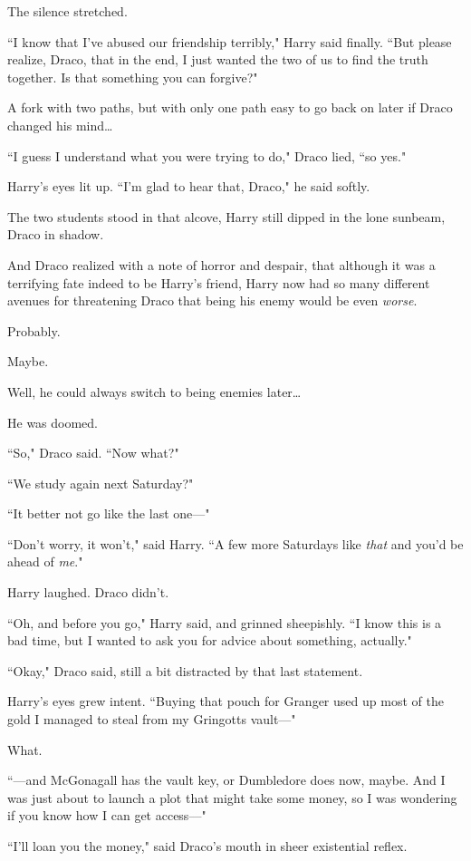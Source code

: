 The silence stretched.

``I know that I've abused our friendship terribly," Harry said finally. ``But please realize, Draco, that in the end, I just wanted the two of us to find the truth together. Is that something you can forgive?"

A fork with two paths, but with only one path easy to go back on later if Draco changed his mind{\ldots}

``I guess I understand what you were trying to do," Draco lied, ``so yes."

Harry's eyes lit up. ``I'm glad to hear that, Draco," he said softly.

The two students stood in that alcove, Harry still dipped in the lone sunbeam, Draco in shadow.

And Draco realized with a note of horror and despair, that although it was a terrifying fate indeed to be Harry's friend, Harry now had so many different avenues for threatening Draco that being his enemy would be even \emph{worse}.

Probably.

Maybe.

Well, he could always switch to being enemies later{\ldots}

He was doomed.

``So," Draco said. ``Now what?"

``We study again next Saturday?"

``It better not go like the last one—"

``Don't worry, it won't," said Harry. ``A few more Saturdays like \emph{that} and you'd be ahead of \emph{me}."

Harry laughed. Draco didn't.

``Oh, and before you go," Harry said, and grinned sheepishly. ``I know this is a bad time, but I wanted to ask you for advice about something, actually."

``Okay," Draco said, still a bit distracted by that last statement.

Harry's eyes grew intent. ``Buying that pouch for Granger used up most of the gold I managed to steal from my Gringotts vault—"

What.

``—and McGonagall has the vault key, or Dumbledore does now, maybe. And I was just about to launch a plot that might take some money, so I was wondering if you know how I can get access—"

``I'll loan you the money," said Draco's mouth in sheer existential reflex.

